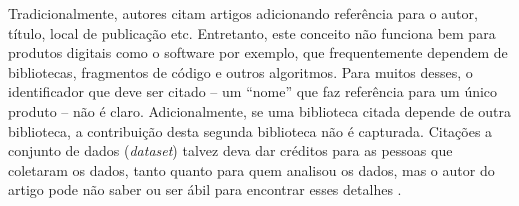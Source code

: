 Tradicionalmente, autores citam artigos adicionando referência para o autor,
título, local de publicação etc. Entretanto, este conceito não funciona bem
para produtos digitais como o software por exemplo, que frequentemente dependem
de bibliotecas, fragmentos de código e outros algoritmos. Para muitos desses, o
identificador que deve ser citado -- um ``nome'' que faz referência para um
único produto -- não é claro.  Adicionalmente, se uma biblioteca citada depende
de outra biblioteca, a contribuição desta segunda biblioteca não é capturada.
Citações a conjunto de dados ({\it dataset}) talvez deva dar créditos para as
pessoas que coletaram os dados, tanto quanto para quem analisou os dados, mas o
autor do artigo pode não saber ou ser ábil para encontrar esses detalhes
\cite{katz2014transitive}.
